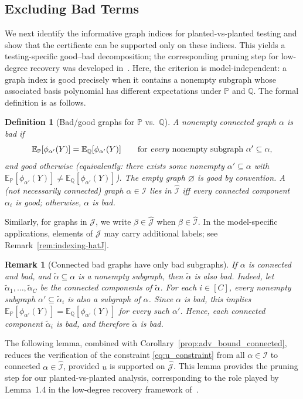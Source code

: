 \documentclass[11pt, letterpaper]{article}
\newtheorem{definition}[theorem]{Definition}
\newtheorem{remark}[theorem]{Remark}
\numberwithin{equation}{section}
\newcommand{\E}{\mathbb{E}}
\newcommand{\PP}{\mathbb{P}}
\newcommand{\QQ}{\mathbb{Q}}
\newcommand{\goodI}{\widehat{\mathcal{I}}}
\newcommand{\goodJ}{\widehat{\mathcal{J}}}
\begin{document}
\subsection{Excluding Bad Terms}\label{sec:bad_terms}

\noindent We next identify the informative graph indices for planted-vs-planted testing and show that the certificate can be supported only on these indices. This yields a testing-specific good--bad decomposition; the corresponding pruning step for low-degree recovery was developed in~\cite{sohn2025sharp}. Here, the criterion is model-independent: a graph index is good precisely when it contains a nonempty subgraph whose associated basis polynomial has different expectations under $\PP$ and $\QQ$. The formal definition is as follows.
\begin{definition}[Bad/good graphs for $\PP$ vs.\ $\QQ$]\label{def:good_graphs}
%
A nonempty connected graph $\alpha$ is \emph{bad} if
\[
\E_\PP[\phi_{\alpha'}(Y)]=\E_\QQ[\phi_{\alpha'}(Y)]
\qquad\text{for \emph{every} nonempty subgraph } \alpha'\subseteq \alpha,
\]
and \emph{good} otherwise (equivalently: there exists \emph{some} nonempty
$\alpha'\subseteq \alpha$ with $\E_\PP[\phi_{\alpha'}(Y)]\neq \E_\QQ[\phi_{\alpha'}(Y)]$).
The empty graph $\varnothing$ is good by convention. A (not necessarily connected)
graph $\alpha\in\mathcal I$ lies in $\goodI$ iff every connected
 component $\alpha_i$ is good; otherwise, $\alpha$ is bad.
\end{definition}
Similarly, for graphs in $\mathcal J$, we write $\beta\in\goodJ$ when $\beta\in\goodI$. In the model-specific applications, elements of $\mathcal J$ may carry additional labels; see Remark~\ref{rem:indexing-hatJ}.
\begin{remark}[Connected bad graphs have only bad subgraphs]\label{rem:downward_new}
If $\alpha$ is connected and bad, and $\tilde\alpha\subseteq\alpha$ is a nonempty subgraph, then $\tilde\alpha$ is also bad. Indeed, let $\tilde\alpha_1,\dots,\tilde\alpha_C$ be the connected components of $\tilde\alpha$. For each $i\in [C]$, every nonempty subgraph $\alpha'\subseteq\tilde\alpha_i$ is also a subgraph of $\alpha$. Since $\alpha$ is bad, this implies $\E_\PP[\phi_{\alpha'}(Y)]=\E_\QQ[\phi_{\alpha'}(Y)]$ for every such $\alpha'$. Hence, each connected component $\tilde\alpha_i$ is bad, and therefore $\tilde\alpha$ is bad.
\end{remark}

The following lemma, combined with Corollary~\ref{prop:adv_bound_connected}, reduces the verification of the constraint
\eqref{eq:u_constraint} from all $\alpha\in\mathcal I$ to connected
$\alpha\in\goodI$, provided $u$ is supported on $\goodJ$. This lemma provides the pruning step for our planted-vs-planted analysis, corresponding to the role played by Lemma~1.4 in the low-degree recovery framework of~\cite{sohn2025sharp}.
\end{document}
